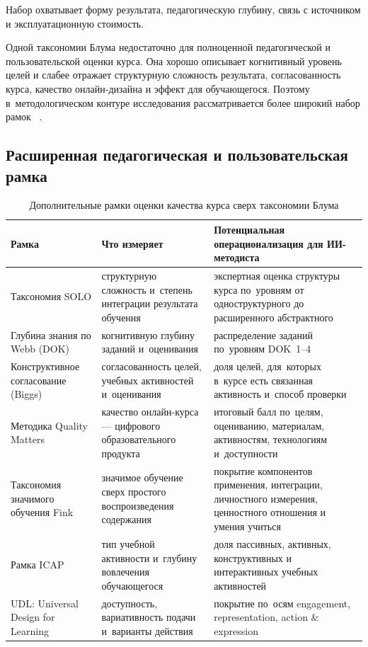 Набор охватывает форму результата, педагогическую глубину, связь
с источником и эксплуатационную стоимость.

Одной таксономии Блума недостаточно для полноценной
педагогической и пользовательской оценки курса. Она хорошо описывает
когнитивный уровень целей и слабее отражает структурную сложность
результата, согласованность курса, качество онлайн-дизайна и эффект
для обучающегося. Поэтому в~методологическом контуре исследования
рассматривается более широкий набор рамок
~\cite{monash_solo_2026, webb_dok_guide_2013,
advancehe_constructive_alignment_2026, quality_matters_he_rubric_2026,
fink_significant_learning_2026, chi_wylie_2014, cast_udl_2024}.

\subsection{Расширенная педагогическая и пользовательская рамка}

\begin{table}[H]
  \centering
  \small
  \setlength{\tabcolsep}{3pt}
  \caption{Дополнительные рамки оценки качества курса сверх таксономии Блума}
  \label{tab:extended-learning-metrics}
  \begin{tabular}{|P{3.2cm}|P{4.0cm}|P{5.3cm}|}
  \hline
  \textbf{Рамка} & \textbf{Что измеряет} & \textbf{Потенциальная операционализация для ИИ-методиста} \\
  \hline
  Таксономия SOLO
    & структурную сложность и~степень интеграции результата обучения
    & экспертная оценка структуры курса по~уровням
      от одноструктурного до расширенного абстрактного \\
  \hline
  Глубина знания по Webb (DOK)
    & когнитивную глубину заданий и~оценивания
    & распределение заданий по~уровням DOK~1–4 \\
  \hline
  Конструктивное согласование (Biggs)
    & согласованность целей, учебных активностей и~оценивания
    & доля целей, для~которых в~курсе есть связанная активность
      и~способ проверки \\
  \hline
  Методика Quality Matters
    & качество онлайн-курса — цифрового образовательного продукта
    & итоговый балл по~целям, оцениванию, материалам,
      активностям, технологиям и~доступности \\
  \hline
  Таксономия значимого обучения Fink
    & значимое обучение сверх простого воспроизведения содержания
    & покрытие компонентов применения, интеграции,
      личностного измерения, ценностного отношения и умения учиться \\
  \hline
  Рамка ICAP
    & тип учебной активности и~глубину вовлечения обучающегося
    & доля пассивных, активных, конструктивных и интерактивных
      учебных активностей \\
  \hline
  UDL: Universal Design for Learning
    & доступность, вариативность подачи и~варианты действия
    & покрытие по~осям engagement, representation,
      action \& expression \\
  \hline
\end{tabular}
\end{table}

